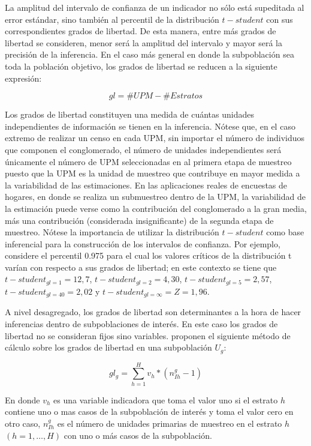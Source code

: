 \documentclass[
  10pt,
  spanish,
]{book}
\begin{document}
La amplitud del intervalo de confianza de un indicador no sólo está supeditada al error estándar, sino también al percentil de la distribución \(t-student\) con sus correspondientes grados de libertad. De esta manera, entre más grados de libertad se consideren, menor será la amplitud del intervalo y mayor será la precisión de la inferencia. En el caso más general en donde la subpoblación sea toda la población objetivo, los grados de libertad se reducen a la siguiente expresión:

\[
gl = \# UPM - \# Estratos
\]

Los grados de libertad constituyen una medida de cuántas unidades independientes de información se tienen en la inferencia. Nótese que, en el caso extremo de realizar un censo en cada UPM, sin importar el número de individuos que componen el conglomerado, el número de unidades independientes será únicamente el número de UPM seleccionadas en al primera etapa de muestreo puesto que la UPM es la unidad de muestreo que contribuye en mayor medida a la variabilidad de las estimaciones. En las aplicaciones reales de encuestas de hogares, en donde se realiza un submuestreo dentro de la UPM, la variabilidad de la estimación puede verse como la contribución del conglomerado a la gran media, más una contribución (considerada insignificante) de la segunda etapa de muestreo. Nótese la importancia de utilizar la distribución \(t-student\) como base inferencial para la construcción de los intervalos de confianza. Por ejemplo, considere el percentil 0.975 para el cual los valores críticos de la distribución t varían con respecto a sus grados de libertad; en este contexto se tiene que \(t-student_{gl = 1} = 12,7\), \(t-student_{gl = 2} = 4,30\), \(t-student_{gl = 5} = 2,57\), \(t-student_{gl = 40} = 2,02\) y \(t-student_{gl = \infty} = Z = 1,96\).

A nivel desagregado, los grados de libertad son determinantes a la hora de hacer inferencias dentro de subpoblaciones de interés. En este caso los grados de libertad no se consideran fijos sino variables. \citet[p.~209]{Korn_Graubard_1999} proponen el siguiente método de cálculo sobre los grados de libertad en una subpoblación \(U_g\):

\[
gl_{g} = \sum_{h=1}^H v_h*(n_{Ih}^g - 1)
\]

En donde \(v_h\) es una variable indicadora que toma el valor uno si el estrato \(h\) contiene uno o mas casos de la subpoblación de interés y toma el valor cero en otro caso, \(n_{Ih}^g\) es el número de unidades primarias de muestreo en el estrato \(h\) \((h=1, \ldots, H)\) con uno o más casos de la subpoblación.
\end{document}
